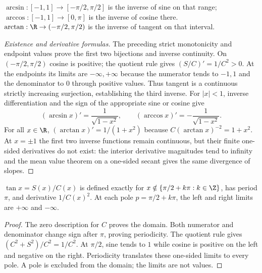 \begin{definition}
$\arcsin:[-1,1]\to[-\pi/2,\pi/2]$ is the inverse of sine on that range;
$\arccos:[-1,1]\to[0,\pi]$ is the inverse of cosine there.
$\arctan:\R\to(-\pi/2,\pi/2)$ is the inverse of tangent on that interval.
\end{definition}
\begin{proof}[Existence and derivative formulas]
The preceding strict monotonicity and endpoint values prove the first two
bijections and inverse continuity. On $(-\pi/2,\pi/2)$ cosine is positive;
the quotient rule gives $(S/C)'=1/C^2>0$. At the endpoints its limits are
$-\infty,+\infty$ because the numerator tends to $-1,1$ and the
denominator to $0$ through positive values. Thus tangent is a continuous
strictly increasing surjection, establishing the third inverse.
For $|x|<1$, inverse differentiation and the sign of the appropriate sine
or cosine give
\[(\arcsin x)'=\frac1{\sqrt{1-x^2}},\qquad
(\arccos x)'=-\frac1{\sqrt{1-x^2}}.
\]
For all $x\in\R$, $(\arctan x)'=1/(1+x^2)$ because
$C(\arctan x)^{-2}=1+x^2$. At $x=\pm1$ the first two inverse functions
remain continuous, but their finite one-sided derivatives do not exist:
the interior derivative magnitudes tend to infinity and the mean value
theorem on a one-sided secant gives the same divergence of slopes.
\end{proof}

\begin{proposition}
$\tan x=S(x)/C(x)$ is defined exactly for
$x\notin\{\pi/2+k\pi:k\in\Z\}$, has period $\pi$, and derivative
$1/C(x)^2$. At each pole $p=\pi/2+k\pi$, the left and right limits
are $+\infty$ and $-\infty$.
\end{proposition}
\begin{proof}
The zero description for $C$ proves the domain. Both numerator and
denominator change sign after $\pi$, proving periodicity.
The quotient rule gives $(C^2+S^2)/C^2=1/C^2$.
At $\pi/2$, sine tends to $1$ while cosine is positive on the left and
negative on the right. Periodicity translates these one-sided limits to
every pole. A pole is excluded from the domain; the limits are not values.
\end{proof}

